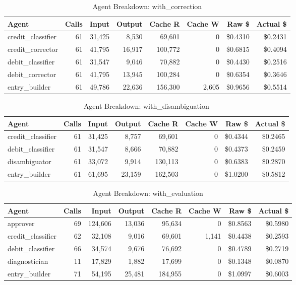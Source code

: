 \begin{table}[htbp]
\centering
\caption{Agent Breakdown: with\_correction}
\label{tab:agent-with-correction}
\begin{tabular}{l r rr rr rr}
\toprule
Agent & Calls & Input & Output & Cache R & Cache W & Raw \$ & Actual \$ \\
\midrule
  credit\_classifier & 61 & 31,425 & 8,530 & 69,601 & 0 & \$0.4310 & \$0.2431 \\
  credit\_corrector & 61 & 41,795 & 16,917 & 100,772 & 0 & \$0.6815 & \$0.4094 \\
  debit\_classifier & 61 & 31,547 & 9,046 & 70,882 & 0 & \$0.4430 & \$0.2516 \\
  debit\_corrector & 61 & 41,795 & 13,945 & 100,284 & 0 & \$0.6354 & \$0.3646 \\
  entry\_builder & 61 & 49,786 & 22,636 & 156,300 & 2,605 & \$0.9656 & \$0.5514 \\
\bottomrule
\end{tabular}
\end{table}

\begin{table}[htbp]
\centering
\caption{Agent Breakdown: with\_disambiguation}
\label{tab:agent-with-disambiguation}
\begin{tabular}{l r rr rr rr}
\toprule
Agent & Calls & Input & Output & Cache R & Cache W & Raw \$ & Actual \$ \\
\midrule
  credit\_classifier & 61 & 31,425 & 8,757 & 69,601 & 0 & \$0.4344 & \$0.2465 \\
  debit\_classifier & 61 & 31,547 & 8,666 & 70,882 & 0 & \$0.4373 & \$0.2459 \\
  disambiguator & 61 & 33,072 & 9,914 & 130,113 & 0 & \$0.6383 & \$0.2870 \\
  entry\_builder & 61 & 61,695 & 23,159 & 162,503 & 0 & \$1.0200 & \$0.5812 \\
\bottomrule
\end{tabular}
\end{table}

\begin{table}[htbp]
\centering
\caption{Agent Breakdown: with\_evaluation}
\label{tab:agent-with-evaluation}
\begin{tabular}{l r rr rr rr}
\toprule
Agent & Calls & Input & Output & Cache R & Cache W & Raw \$ & Actual \$ \\
\midrule
  approver & 69 & 124,606 & 13,036 & 95,634 & 0 & \$0.8563 & \$0.5980 \\
  credit\_classifier & 62 & 32,108 & 9,016 & 69,601 & 1,141 & \$0.4438 & \$0.2593 \\
  debit\_classifier & 66 & 34,574 & 9,676 & 76,692 & 0 & \$0.4789 & \$0.2719 \\
  diagnostician & 11 & 17,829 & 1,882 & 17,699 & 0 & \$0.1348 & \$0.0870 \\
  entry\_builder & 71 & 54,195 & 25,481 & 184,955 & 0 & \$1.0997 & \$0.6003 \\
\bottomrule
\end{tabular}
\end{table}
